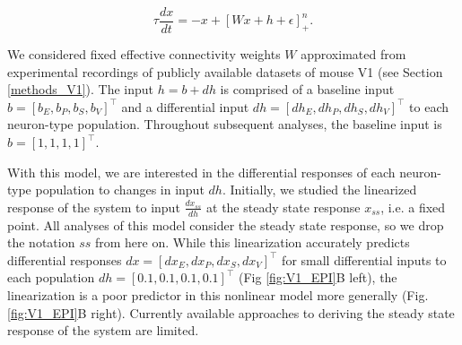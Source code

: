 \documentclass[11pt]{article}
\begin{document}
\begin{equation}
\tau \frac{dx}{dt} = -x + [W x+ h + \epsilon]_+^n.
\end{equation}

We considered fixed effective connectivity weights $W$ approximated from experimental recordings of publicly available datasets of mouse V1 \cite{allen2018layer, billeh2019systematic} (see Section \ref{methods_V1}).
The input $h = b + dh$ is comprised of a baseline input  $b = \left[ b_E, b_P , b_S , b_V \right]^\top$ and a differential input $dh = \left[ dh_E , dh_P , dh_S , dh_V\right]^\top$ to each neuron-type population.  
Throughout subsequent analyses, the baseline input is $b = \left[ 1 ,1,1,1\right]^\top$. 

With this model, we are interested in the differential responses of each neuron-type population to changes in input $dh$. 
Initially, we studied the linearized response of the system to input $\frac{dx_{ss}}{dh}$ at the steady state response $x_{ss}$, i.e. a fixed point. 
All analyses of this model consider the steady state response, so we drop the notation $ss$ from here on.
While this linearization accurately predicts differential responses $dx = \left[ dx_{E} , dx_{P} , dx_{S} ,dx_{V} \right]^\top$  for small differential inputs to each population $dh = \left[ 0.1 , 0.1 , 0.1 , 0.1 \right]^\top$ (Fig \ref{fig:V1_EPI}B left), the linearization is a poor predictor in this nonlinear model more generally (Fig. \ref{fig:V1_EPI}B right).  
Currently available approaches to deriving the steady state response of the system are limited.
\end{document}
